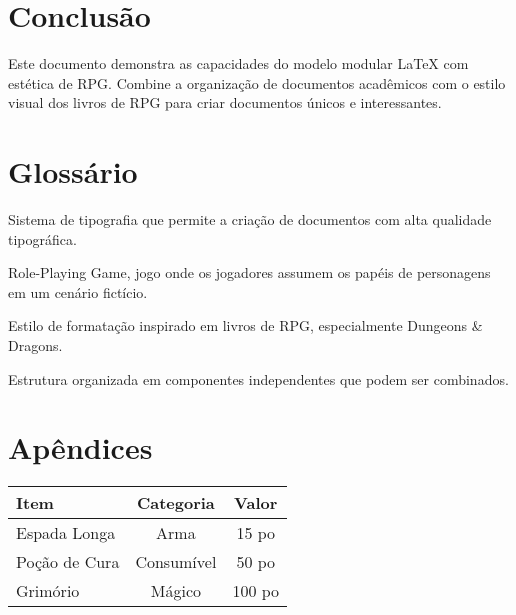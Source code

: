 
\cleardoublepage
\chapter*{Conclusão}

Este documento demonstra as capacidades do modelo modular LaTeX com estética de RPG. Combine a organização de documentos acadêmicos com o estilo visual dos livros de RPG para criar documentos únicos e interessantes.

\cleardoublepage
\chapter*{Glossário}

\begin{description}[style=nextline, leftmargin=0cm]
    \item[LaTeX] Sistema de tipografia que permite a criação de documentos com alta qualidade tipográfica.
    \item[RPG] Role-Playing Game, jogo onde os jogadores assumem os papéis de personagens em um cenário fictício.
    \item[Homebrewery] Estilo de formatação inspirado em livros de RPG, especialmente Dungeons \& Dragons.
    \item[Modular] Estrutura organizada em componentes independentes que podem ser combinados.
\end{description}

\cleardoublepage
\chapter*{Apêndices}

\begin{rpgtable}
\begin{tabular}{lcc}
\toprule
\textbf{Item} & \textbf{Categoria} & \textbf{Valor} \\
\midrule
Espada Longa & Arma & 15 po \\
Poção de Cura & Consumível & 50 po \\
Grimório & Mágico & 100 po \\
\bottomrule
\end{tabular}
\end{rpgtable}

\cleardoublepage
\printbibliography[title=Referências]
